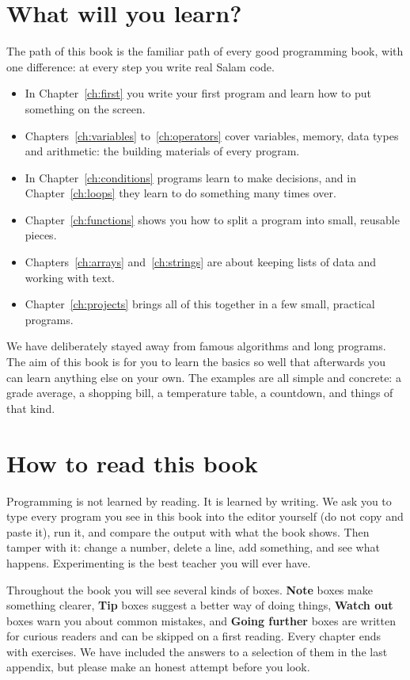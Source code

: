 \section*{What will you learn?}

The path of this book is the familiar path of every good programming book,
with one difference: at every step you write real Salam code.
\begin{itemize}
  \item In Chapter~\ref{ch:first} you write your first program and learn
        how to put something on the screen.
  \item Chapters~\ref{ch:variables} to~\ref{ch:operators} cover variables,
        memory, data types and arithmetic: the building materials of every
        program.
  \item In Chapter~\ref{ch:conditions} programs learn to make decisions, and
        in Chapter~\ref{ch:loops} they learn to do something many times
        over.
  \item Chapter~\ref{ch:functions} shows you how to split a program into
        small, reusable pieces.
  \item Chapters~\ref{ch:arrays} and~\ref{ch:strings} are about keeping
        lists of data and working with text.
  \item Chapter~\ref{ch:projects} brings all of this together in a few
        small, practical programs.
\end{itemize}
We have deliberately stayed away from famous algorithms and long programs.
The aim of this book is for you to learn the basics so well that afterwards
you can learn anything else on your own. The examples are all simple and
concrete: a grade average, a shopping bill, a temperature table, a
countdown, and things of that kind.

\section*{How to read this book}

Programming is not learned by reading. It is learned by writing. We ask you
to type every program you see in this book into the editor yourself (do not
copy and paste it), run it, and compare the output with what the book shows.
Then tamper with it: change a number, delete a line, add something, and see
what happens. Experimenting is the best teacher you will ever have.

Throughout the book you will see several kinds of boxes. \textbf{Note}
boxes make something clearer, \textbf{Tip} boxes suggest a better way of
doing things, \textbf{Watch out} boxes warn you about common mistakes, and
\textbf{Going further} boxes are written for curious readers and can be
skipped on a first reading. Every chapter ends with exercises. We have
included the answers to a selection of them in the last appendix, but please
make an honest attempt before you look.

